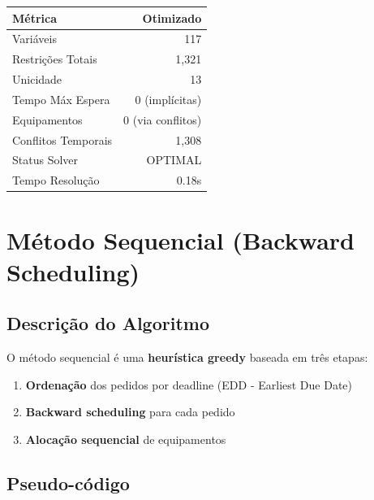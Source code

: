 \documentclass[11pt,a4paper]{article}
\begin{document}
\begin{center}
\begin{tabular}{lr}
\toprule
\textbf{Métrica} & \textbf{Otimizado} \\
\midrule
Variáveis & 117  \\
Restrições Totais & 1,321  \\
\hspace{0.5cm} Unicidade & 13  \\
\hspace{0.5cm} Tempo Máx Espera & 0 (implícitas)  \\
\hspace{0.5cm} Equipamentos & 0 (via conflitos)  \\
\hspace{0.5cm} Conflitos Temporais & 1,308  \\
Status Solver & OPTIMAL  \\
Tempo Resolução & 0.18s  \\
\bottomrule
\end{tabular}
\end{center}

\section{Método Sequencial (Backward Scheduling)}

\subsection{Descrição do Algoritmo}

O método sequencial é uma \textbf{heurística greedy} baseada em três etapas:

\begin{enumerate}
    \item \textbf{Ordenação} dos pedidos por deadline (EDD - Earliest Due Date)
    \item \textbf{Backward scheduling} para cada pedido
    \item \textbf{Alocação sequencial} de equipamentos
\end{enumerate}

\subsection{Pseudo-código}
\end{document}
